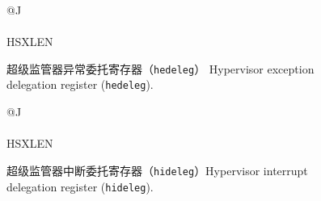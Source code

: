 \begin{figure}[h!]
{\footnotesize
\begin{center}
\begin{tabular}{@{}J}
 \\
\hline
{} \\
\hline
HSXLEN \\
\end{tabular}
\end{center}
}
\vspace{-0.1in}
\caption{超级监管器异常委托寄存器（{\tt hedeleg}） Hypervisor exception delegation register ({\tt hedeleg}).}
\label{hedelegreg}
\end{figure}

\begin{figure}[h!]
{\footnotesize
\begin{center}
\begin{tabular}{@{}J}
 \\
\hline
{} \\
\hline
HSXLEN \\
\end{tabular}
\end{center}
}
\vspace{-0.1in}
\caption{超级监管器中断委托寄存器（{\tt hideleg}）Hypervisor interrupt delegation register ({\tt hideleg}).}
\label{hidelegreg}
\end{figure}

